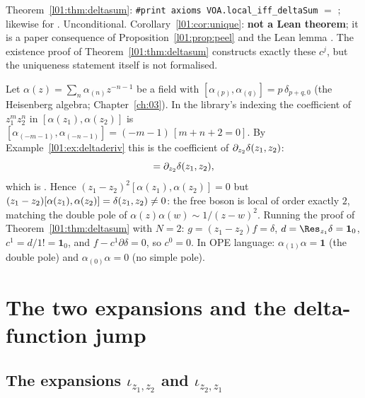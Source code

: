 \begin{status}
Theorem~\ref{l01:thm:deltasum}: \texttt{\#print axioms VOA.local\_iff\_deltaSum} $=$
; likewise for
. Unconditional. Corollary~\ref{l01:cor:unique}: \textbf{not a Lean
theorem}; it is a paper consequence of Proposition~\ref{l01:prop:peel} and the Lean lemma
. The existence proof of Theorem~\ref{l01:thm:deltasum} constructs exactly these
$c^j$, but the uniqueness statement itself is not formalised.
\end{status}

\begin{example}\label{l01:ex:boson}
Let $\alpha(z) = \sum_n\alpha_{(n)}z^{-n-1}$ be a field with $[\alpha_{(p)},\alpha_{(q)}] = p\,\delta_{p+q,0}$ (the
Heisenberg algebra; Chapter~\ref{ch:03}). In the library's indexing the coefficient of $z_1^mz_2^n$ in
$[\alpha(z_1),\alpha(z_2)]$ is $[\alpha_{(-m-1)},\alpha_{(-n-1)}] = (-m-1)\,[m+n+2 = 0]$. By
Example~\ref{l01:ex:deltaderiv} this is the coefficient of $\partial_{z_2}\delta(z_1,z_2)$:
\begin{equation*}
  [\alpha(z_1),\alpha(z_2)] = \partial_{z_2}\lonedelta,
\end{equation*}
which is . Hence $(z_1-z_2)^2[\alpha(z_1),\alpha(z_2)] = 0$ but
$(z_1-z_2)[\alpha(z_1),\alpha(z_2)] = \delta(z_1,z_2)\neq0$: the free boson is local of order exactly $2$, matching the
double pole of $\alpha(z)\alpha(w)\sim1/(z-w)^2$. Running the proof of Theorem~\ref{l01:thm:deltasum} with
$N = 2$: $g = (z_1-z_2)f = \delta$, $d = \Res_{z_1}\delta = \mathbf 1_0$, $c^1 = d/1! = \mathbf 1_0$, and
$f-c^1\partial\delta = 0$, so $c^0 = 0$. In OPE language: $\alpha_{(1)}\alpha = \mathbf 1$ (the double pole) and
$\alpha_{(0)}\alpha = 0$ (no simple pole).
\end{example}

\section{The two expansions and the delta-function jump}\label{l01:sec:expansions}

\subsection{The expansions \texorpdfstring{$\iota_{z_1,z_2}$ and $\iota_{z_2,z_1}$}{iota12 and iota21}}

